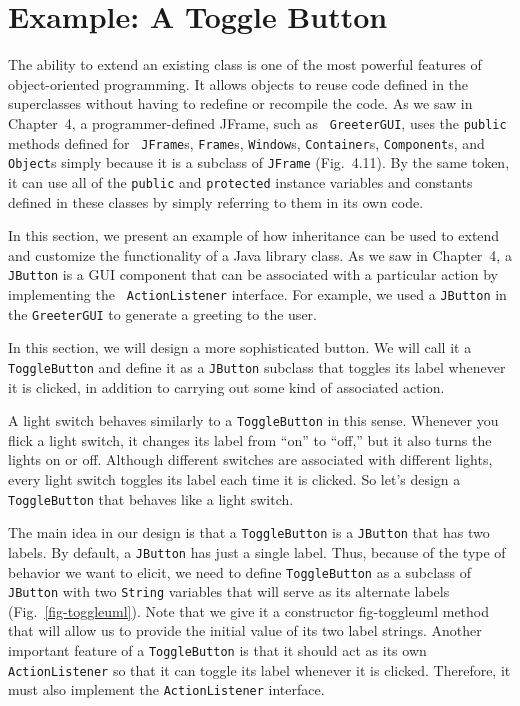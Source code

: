 \section{Example: A Toggle Button}
\label{sec-toggle}


\noindent The ability to extend an existing class is one of the most
 powerful features of object-oriented
programming.  It allows objects to reuse code defined in the
superclasses without having to redefine or recompile the code.  As we
saw in Chapter~4, a programmer-defined JFrame, such as {\tt
GreeterGUI}, uses the {\tt public} methods defined for {\tt
JFrame}s, {\tt Frame}s,  {\tt Window}s, {\tt Container}s, {\tt Component}s, and {\tt
Object}s simply because it is a subclass of {\tt JFrame}
(Fig.~4.11).  By the same token, it can use all of the {\tt public}
and {\tt protected} instance variables and constants defined in these
classes by simply referring to them in its own code.

In this section, we present an example of how inheritance can be used
to extend and customize the functionality of a Java library class. As
we saw in Chapter~4, a {\tt JButton} is a GUI component that can be
associated with a particular action by implementing the {\tt
ActionListener} interface.  For example, we used a {\tt JButton} in
the {\tt GreeterGUI} to generate a greeting to the user.

In this section, we will design a more sophisticated button. 
We will call it a  {\tt ToggleButton} and define it as a {\tt JButton} subclass that
toggles its label whenever it is clicked, in addition to
carrying out some kind of associated action.

A light switch behaves similarly to a {\tt ToggleButton} in this
sense.  Whenever you flick a light switch, it changes its label from
``on'' to ``off,'' but it also turns the lights on or off.  Although
different switches are associated with different lights, every light
switch toggles its label each time it is clicked.  So let's design a
{\tt ToggleButton} that behaves like a light switch.

The main idea in our design is that a {\tt ToggleButton} is a
{\tt JButton} that has two labels. By default, a {\tt JButton} has just
a single label. Thus, because of the type of behavior we want to elicit,
we need to define {\tt ToggleButton} as a subclass of
{\tt JButton} with two {\tt String} variables that will serve as its
alternate labels (Fig.~\ref{fig-toggleuml}). Note that we give it a constructor
{fig-toggleuml}
method that will allow us to provide the initial value of its two
label strings. Another important feature of a {\tt ToggleButton} is
that it should act as its own {\tt ActionListener} so that it can
toggle its label whenever it is clicked. Therefore, it must also
implement the {\tt ActionListener} interface.  

